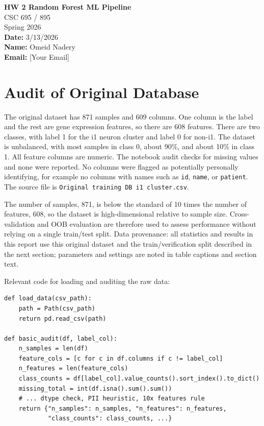 \documentclass[11pt]{article}
\begin{document}
\begin{titlepage}
\centering
\vspace*{\fill}
{\LARGE \textbf{HW 2 Random Forest ML Pipeline}}\\[2em]
{\large CSC 695 / 895}\\[0.5em]
Spring 2026\\[1.5em]
\textbf{Date:} 3/13/2026\\[1em]
\textbf{Name:} Omeid Nadery\\[0.5em]
\textbf{Email:} [Your Email]\\
\vspace*{\fill}
\end{titlepage}

\section{Audit of Original Database}

The original dataset has 871 samples and 609 columns. One column is the label and the rest are gene expression features, so there are 608 features. There are two classes, with label 1 for the i1 neuron cluster and label 0 for non-i1. The dataset is unbalanced, with most samples in class 0, about 90\%, and about 10\% in class 1. All feature columns are numeric. The notebook audit checks for missing values and none were reported. No columns were flagged as potentially personally identifying, for example no columns with names such as \texttt{id}, \texttt{name}, or \texttt{patient}. The source file is \texttt{Original training DB i1 cluster.csv}.

The number of samples, 871, is below the standard of 10 times the number of features, 608, so the dataset is high-dimensional relative to sample size. Cross-validation and OOB evaluation are therefore used to assess performance without relying on a single train/test split. Data provenance: all statistics and results in this report use this original dataset and the train/verification split described in the next section; parameters and settings are noted in table captions and section text.

Relevant code for loading and auditing the raw data:

\begin{lstlisting}[style=pythonstyle]
def load_data(csv_path):
    path = Path(csv_path)
    return pd.read_csv(path)

def basic_audit(df, label_col):
    n_samples = len(df)
    feature_cols = [c for c in df.columns if c != label_col]
    n_features = len(feature_cols)
    class_counts = df[label_col].value_counts().sort_index().to_dict()
    missing_total = int(df.isna().sum().sum())
    # ... dtype check, PII heuristic, 10x features rule
    return {"n_samples": n_samples, "n_features": n_features,
            "class_counts": class_counts, ...}
\end{lstlisting}
\end{document}
